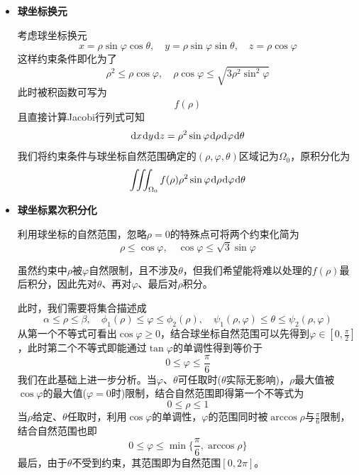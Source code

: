 \documentclass[a4paper,UTF8,fontset=windows,AutoFakeBold]{ctexart}
\newcommand*{\dr}{\hspace{0.07em}\mathrm{d}}
\theoremstyle{ex}
\begin{document}
\begin{enumerate}
{\begin{itemize}
            综合以上，可最终写出积分
            $$\int_0^1\dr z\int_0^{\min\{\sqrt{z-z^2},z/\sqrt3\}}\dr r\int_0^{2\pi}f(\sqrt{r^2+z^2})r\dr\theta$$
            或对$\theta$积分后化为
            $$2\pi\int_0^1\dr z\int_0^{\min\{\sqrt{z-z^2},z/\sqrt3\}}f(\sqrt{r^2+z^2})r\dr r$$
            
            \item \textbf{球坐标换元}
            
            考虑球坐标换元
            $$x=\rho\sin\varphi\cos\theta,\quad y=\rho\sin\varphi\sin\theta,\quad z=\rho\cos\varphi$$
            这样约束条件即化为了
            $$\rho^2\le\rho\cos\varphi,\quad \rho\cos\varphi\le\sqrt{3\rho^2\sin^2\varphi}$$
            此时被积函数可写为
            $$f(\rho)$$
            且直接计算Jacobi行列式可知
            $$\dr x\dr y\dr z=\rho^2\sin\varphi\dr\rho\dr\varphi\dr\theta$$
            我们将约束条件与球坐标自然范围确定的$(\rho,\varphi,\theta)$区域记为$\Omega_0$，原积分化为
            $$\iiint_{\Omega_0}f(\rho)\rho^2\sin\varphi\dr\rho\dr\varphi\dr\theta$$
            
            \item \textbf{球坐标累次积分化}
            
            利用球坐标的自然范围，忽略$\rho=0$的特殊点可将两个约束化简为
            $$\rho\le\cos\varphi,\quad\cos\varphi\le\sqrt{3}\sin\varphi$$
            
            虽然约束中$\rho$被$\varphi$自然限制，且不涉及$\theta$，但我们希望能将难以处理的$f(\rho)$最后积分，因此先对$\theta$、再对$\varphi$、最后对$\rho$积分。
            
            此时，我们需要将集合描述成
            $$\alpha\le\rho\le\beta,\quad \phi_1(\rho)\le\varphi\le\phi_2(\rho),\quad\psi_1(\rho,\varphi)\le\theta\le\psi_2(\rho,\varphi)$$
            从第一个不等式可看出$\cos\varphi\ge0$，结合球坐标自然范围可以先得到$\varphi\in[0,\frac{\pi}{2}]$，此时第二个不等式即能通过$\tan\varphi$的单调性得到等价于
            $$0\le\varphi\le\frac{\pi}{6}$$
            我们在此基础上进一步分析。当$\varphi$、$\theta$可任取时($\theta$实际无影响)，$\rho$最大值被$\cos\varphi$的最大值($\varphi=0$时)限制，结合自然范围即得第一个不等式为
            $$0\le\rho\le1$$
            当$\rho$给定、$\theta$任取时，利用$\cos\varphi$的单调性，$\varphi$的范围同时被$\arccos\rho$与$\frac{\pi}{6}$限制，结合自然范围也即
            $$0\le\varphi\le\min\bigg\{\frac{\pi}{6},\arccos\rho\bigg\}$$
            最后，由于$\theta$不受到约束，其范围即为自然范围$[0,2\pi]$。


\end{itemize}}
\end{enumerate}
\end{document}
